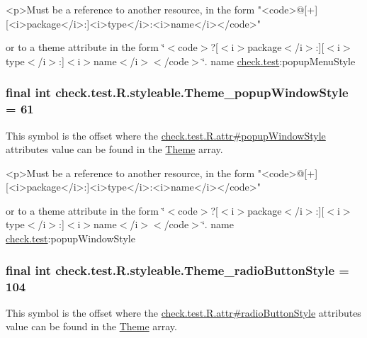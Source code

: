 \begin{DoxyVerb}      <p>Must be a reference to another resource, in the form "<code>@[+][<i>package</i>:]<i>type</i>:<i>name</i></code>"
\end{DoxyVerb}
 or to a theme attribute in the form \char`\"{}$<$code$>$?\mbox{[}$<$i$>$package$<$/i$>$\+:\mbox{]}\mbox{[}$<$i$>$type$<$/i$>$\+:\mbox{]}$<$i$>$name$<$/i$>$$<$/code$>$\char`\"{}.  name \hyperlink{namespacecheck_1_1test}{check.\+test}\+:popup\+Menu\+Style \hypertarget{classcheck_1_1test_1_1_r_1_1styleable_a84838496bac2e683af2e800bfafd3f41}{}
\subsubsection[{Theme\+\_\+popup\+Window\+Style}]{\setlength{\rightskip}{0pt plus 5cm}final int check.\+test.\+R.\+styleable.\+Theme\+\_\+popup\+Window\+Style = 61\hspace{0.3cm}{\ttfamily [static]}}\label{classcheck_1_1test_1_1_r_1_1styleable_a84838496bac2e683af2e800bfafd3f41}
This symbol is the offset where the \hyperlink{classcheck_1_1test_1_1_r_1_1attr_a0ec5c2b453be6a2be04aa78dce81d0b6}{check.\+test.\+R.\+attr\#popup\+Window\+Style} attribute\textquotesingle{}s value can be found in the \hyperlink{classcheck_1_1test_1_1_r_1_1styleable_acca726d02016a0cf607782ec3a436a81}{Theme} array.

\begin{DoxyVerb}      <p>Must be a reference to another resource, in the form "<code>@[+][<i>package</i>:]<i>type</i>:<i>name</i></code>"
\end{DoxyVerb}
 or to a theme attribute in the form \char`\"{}$<$code$>$?\mbox{[}$<$i$>$package$<$/i$>$\+:\mbox{]}\mbox{[}$<$i$>$type$<$/i$>$\+:\mbox{]}$<$i$>$name$<$/i$>$$<$/code$>$\char`\"{}.  name \hyperlink{namespacecheck_1_1test}{check.\+test}\+:popup\+Window\+Style \hypertarget{classcheck_1_1test_1_1_r_1_1styleable_a28affc2ca7d484ddc9e704772938a600}{}
\subsubsection[{Theme\+\_\+radio\+Button\+Style}]{\setlength{\rightskip}{0pt plus 5cm}final int check.\+test.\+R.\+styleable.\+Theme\+\_\+radio\+Button\+Style = 104\hspace{0.3cm}{\ttfamily [static]}}\label{classcheck_1_1test_1_1_r_1_1styleable_a28affc2ca7d484ddc9e704772938a600}
This symbol is the offset where the \hyperlink{classcheck_1_1test_1_1_r_1_1attr_a9fbb336c43ad1f66e9f652efbc698b91}{check.\+test.\+R.\+attr\#radio\+Button\+Style} attribute\textquotesingle{}s value can be found in the \hyperlink{classcheck_1_1test_1_1_r_1_1styleable_acca726d02016a0cf607782ec3a436a81}{Theme} array.

